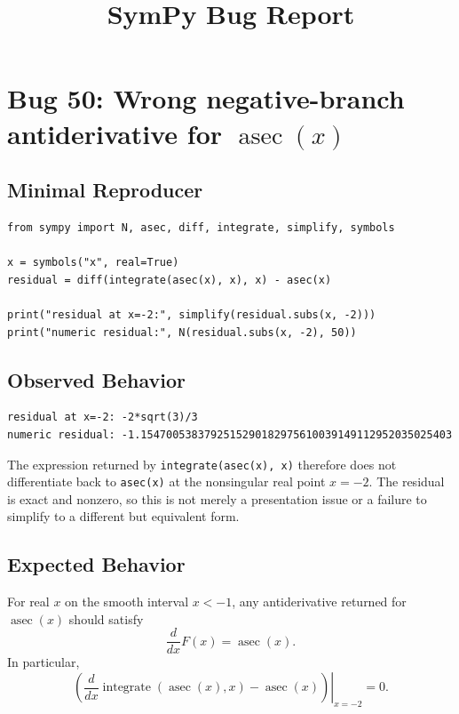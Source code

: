 \documentclass[11pt]{article}
\title{SymPy Bug Report}
\date{}
\begin{document}
\author{}
\maketitle

\section{Bug 50: Wrong negative-branch antiderivative for \texorpdfstring{$\operatorname{asec}(x)$}{asec(x)}}

\subsection{Minimal Reproducer}

\medskip

\begin{lstlisting}[style=bugpython]
from sympy import N, asec, diff, integrate, simplify, symbols

x = symbols("x", real=True)
residual = diff(integrate(asec(x), x), x) - asec(x)

print("residual at x=-2:", simplify(residual.subs(x, -2)))
print("numeric residual:", N(residual.subs(x, -2), 50))
\end{lstlisting}

\subsection{Observed Behavior}

\medskip

\begin{lstlisting}[style=bugpython]
residual at x=-2: -2*sqrt(3)/3
numeric residual: -1.1547005383792515290182975610039149112952035025403
\end{lstlisting}

The expression returned by \texttt{integrate(asec(x), x)} therefore does not
differentiate back to \texttt{asec(x)} at the nonsingular real point \(x=-2\).
The residual is exact and nonzero, so this is not merely a presentation issue
or a failure to simplify to a different but equivalent form.

\subsection{Expected Behavior}

For real \(x\) on the smooth interval \(x<-1\), any antiderivative returned for
\(\operatorname{asec}(x)\) should satisfy
\[
  \frac{d}{dx}F(x)=\operatorname{asec}(x).
\]
In particular,
\[
  \left.
  \left(\frac{d}{dx}\operatorname{integrate}(\operatorname{asec}(x),x)
  -\operatorname{asec}(x)\right)\right|_{x=-2}
  = 0.
\]
\end{document}
